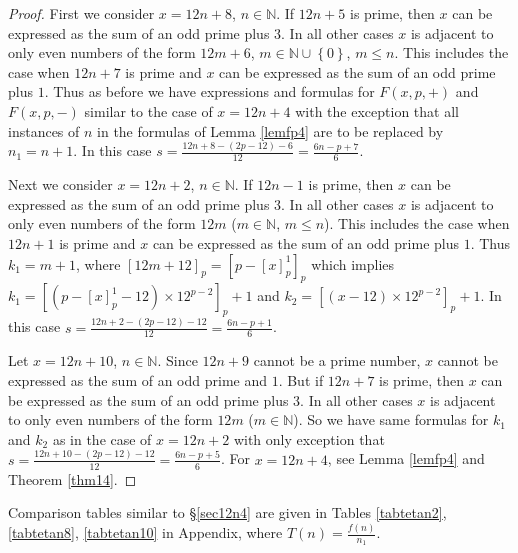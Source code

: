 \documentclass[11pt]{article}
\theoremstyle{definition}
\theoremstyle{remark}
\numberwithin{equation}{section}
\newcommand{\Nat}{\mathbb{N}}
\newcommand{\set}[1]{\left\{#1\right\}}
\begin{document}
\begin{proof}
First we consider $x=12n+8$, $n\in\Nat$. If $12n+5$ is prime, then $x$ can be expressed as the sum of an odd prime plus $3$. In all other cases $x$ is adjacent to only even numbers of the form $12m+6$, $m\in\Nat\cup\set{0}$, $m\leq n$. This includes the case when $12n+7$ is prime and $x$ can be expressed as the sum of an odd prime plus $1$. Thus as before we have expressions and formulas for $F(x,p,+)$ and $F(x,p,-)$ similar to the case of $x=12n+4$ with the exception that all instances of $n$ in the formulas of Lemma \ref{lemfp4} are to be replaced by $n_1=n+1$. In this case $s=\frac{12n+8-(2p-12)-6}{12}=\frac{6n-p+7}{6}$.

\vspace{1em}
\noindent
Next we consider $x=12n+2$, $n\in\Nat$. If $12n-1$ is prime, then $x$ can be expressed as the sum of an odd prime plus $3$. In all other cases $x$ is adjacent to only even numbers of the form $12m$ ($m\in\Nat$, $m\leq n$). This includes the case when $12n+1$ is prime and $x$ can be expressed as the sum of an odd prime plus $1$. Thus $k_1=m+1$, where $[12m+12]_p=[p-[x]_p^1]_p$ which implies $k_1=[(p-[x]_p^1-12)\times 12^{p-2}]_p+1$ and $k_2=[(x-12)\times 12^{p-2}]_p+1$. In this case $s=\frac{12n+2-(2p-12)-12}{12}=\frac{6n-p+1}{6}$.

\vspace{1em}
\noindent
Let $x=12n+10$, $n\in\Nat$. Since $12n+9$ cannot be a prime number, $x$ cannot be expressed as the sum of an odd prime and $1$. But if $12n+7$ is prime, then $x$ can be expressed as the sum of an odd prime plus $3$. In all other cases $x$ is adjacent to only even numbers of the form $12m$ ($m\in\Nat$). So we have same formulas for $k_1$ and $k_2$ as in the case of $x=12n+2$ with only exception that $s=\frac{12n+10-(2p-12)-12}{12}=\frac{6n-p+5}{6}$. For $x=12n+4$, see Lemma \ref{lemfp4} and Theorem \ref{thm14}.
\end{proof}

\noindent
Comparison tables similar to \S \ref{sec12n4} are given in Tables \ref{tabtetan2}, \ref{tabtetan8}, \ref{tabtetan10} in Appendix, where $T(n)=\frac{f(n)}{n_1}$. 
\end{document}
